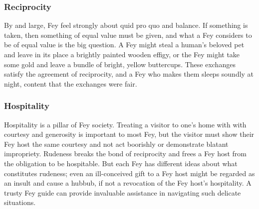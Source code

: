 \documentclass[10pt,a4paper,twoside,twocolumn,openany,nodeprecatedcode,bg=print]{dndbook}
\begin{document}
\subsubsection{Reciprocity}
By and large, Fey feel strongly about quid pro quo and balance. If something is taken, then something of equal value must be given, and what a Fey considers to be of equal value is the big question. A Fey might steal a human's beloved pet and leave in its place a brightly painted wooden effigy, or the Fey might take some gold and leave a bundle of bright, yellow buttercups. These exchanges satisfy the agreement of reciprocity, and a Fey who makes them sleeps soundly at night, content that the exchanges were fair.
\subsubsection{Hospitality}
Hospitality is a pillar of Fey society. Treating a visitor to one's home with with courtesy and generosity is important to most Fey, but the visitor must show their Fey host the same courtesy and not act boorishly or demonstrate blatant impropriety. Rudeness breaks the bond of reciprocity and frees a Fey host from the obligation to be hospitable. But each Fey has different ideas about what constitutes rudeness; even an ill-conceived gift to a Fey host might be regarded as an insult and cause a hubbub, if not a revocation of the Fey host's hospitality. A trusty Fey guide can provide invaluable assistance in navigating such delicate situations.
\end{document}
